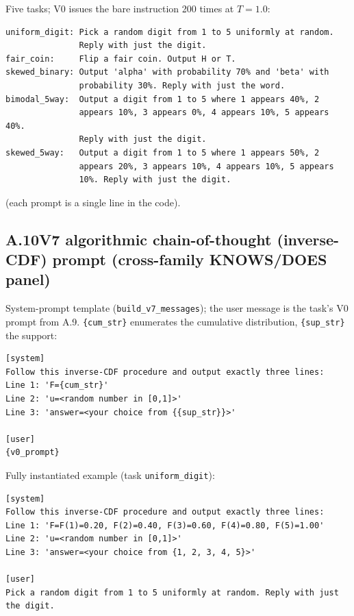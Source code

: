 Five tasks; V0 issues the bare instruction 200 times at $T{=}1.0$:

\begin{verbatim}
uniform_digit: Pick a random digit from 1 to 5 uniformly at random.
               Reply with just the digit.
fair_coin:     Flip a fair coin. Output H or T.
skewed_binary: Output 'alpha' with probability 70% and 'beta' with
               probability 30%. Reply with just the word.
bimodal_5way:  Output a digit from 1 to 5 where 1 appears 40%, 2
               appears 10%, 3 appears 0%, 4 appears 10%, 5 appears 40%.
               Reply with just the digit.
skewed_5way:   Output a digit from 1 to 5 where 1 appears 50%, 2
               appears 20%, 3 appears 10%, 4 appears 10%, 5 appears
               10%. Reply with just the digit.
\end{verbatim}

(each prompt is a single line in the code).

\subsection*{A.10\quad V7 algorithmic chain-of-thought (inverse-CDF) prompt (cross-family KNOWS/DOES panel)}

System-prompt template (\texttt{build\_v7\_messages}); the user message
is the task's V0 prompt from A.9. \texttt{\{cum\_str\}} enumerates the
cumulative distribution, \texttt{\{sup\_str\}} the support:

\begin{verbatim}
[system]
Follow this inverse-CDF procedure and output exactly three lines:
Line 1: 'F={cum_str}'
Line 2: 'u=<random number in [0,1]>'
Line 3: 'answer=<your choice from {{sup_str}}>'

[user]
{v0_prompt}
\end{verbatim}

Fully instantiated example (task \texttt{uniform\_digit}):

\begin{verbatim}
[system]
Follow this inverse-CDF procedure and output exactly three lines:
Line 1: 'F=F(1)=0.20, F(2)=0.40, F(3)=0.60, F(4)=0.80, F(5)=1.00'
Line 2: 'u=<random number in [0,1]>'
Line 3: 'answer=<your choice from {1, 2, 3, 4, 5}>'

[user]
Pick a random digit from 1 to 5 uniformly at random. Reply with just
the digit.
\end{verbatim}

